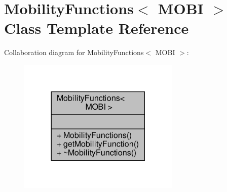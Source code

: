 \hypertarget{classMobilityFunctions}{}\section{Mobility\+Functions$<$ M\+O\+BI $>$ Class Template Reference}
\label{classMobilityFunctions}


Collaboration diagram for Mobility\+Functions$<$ M\+O\+BI $>$\+:\nopagebreak
\begin{figure}[H]
\begin{center}
\leavevmode
\includegraphics[width=218pt]{classMobilityFunctions__coll__graph}
\end{center}
\end{figure}
